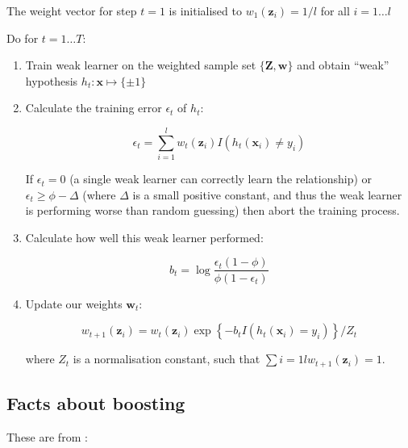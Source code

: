 The weight vector for step $t=1$ is initialised to $w_1(\mathbf{z}_i)
= 1/l$ for all $i=1 \ldots l$

Do for $t=1 \ldots T$:


\begin{enumerate}

\item	Train weak learner on the weighted sample set $\{\mathbf{Z},
	\mathbf{w}\}$ and obtain ``weak'' hypothesis $h_t : \mathbf{x}
	\mapsto \{\pm 1\}$

\item	Calculate the training error $\epsilon_t$ of $h_t$:
	
	\begin{equation}
	\epsilon_t = \sum_{i=1}^l w_t (\mathbf{z}_i)
	I \left( h_t(\mathbf{x}_i) \neq y_i\right)
	\end{equation}

	If $\epsilon_t = 0$ (a single weak learner can correctly learn
	the relationship) or $\epsilon_t \geq \phi - \Delta$ (where
	$\Delta$ is a small positive constant, and thus the weak
	learner is performing worse than random guessing) then abort
	the training process.

\item	Calculate how well this weak learner performed:

	\begin{equation}
	b_t = \log \frac{\epsilon_t (1 - \phi)}{\phi(1 - \epsilon_t)}
	\end{equation}

\item	Update our weights $\mathbf{w}_t$:

	\begin{equation}
	w_{t+1}(\mathbf{z}_i) = w_t(\mathbf{z}_i) \exp 
	\left\{ -b_t I \left( h_t(\mathbf{x}_i) = y_i \right) \right\}
	/ Z_t
	\end{equation}

	where $Z_t$ is a normalisation constant, such that
	$\sum{i=1}{l} w_{t+1}(\mathbf{z}_i) = 1$.

\end{enumerate}



\subsection{Facts about boosting}


These are from \cite{Ratsch98}:

